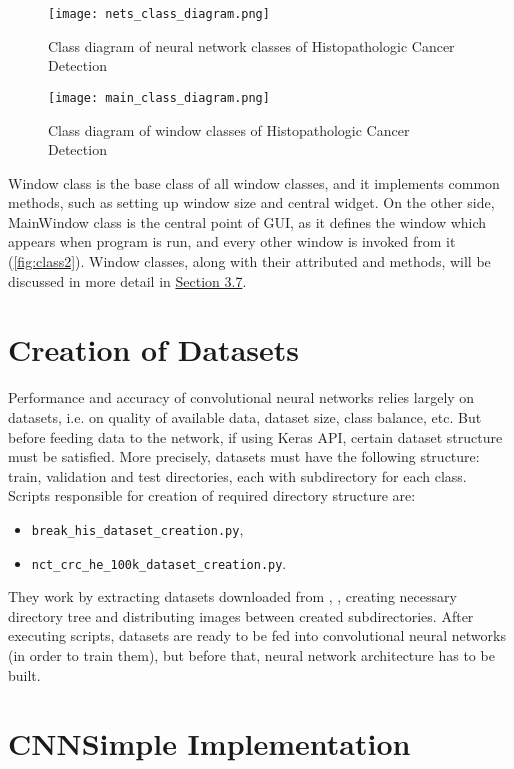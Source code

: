 \begin{figure}[h]
	\centering
	\texttt{[image: nets\_class\_diagram.png]}
	\caption{Class diagram of neural network classes of Histopathologic Cancer Detection}
	\label{fig:class1}
\end{figure}

\begin{figure}
	\centering
	\texttt{[image: main\_class\_diagram.png]}
	\caption{Class diagram of window classes of Histopathologic Cancer Detection}
	\label{fig:class2}
\end{figure}

Window class is the base class of all window classes, and it implements common methods, such as setting up window size and central widget. On the other side, MainWindow class is the central point of GUI, as it defines the window which appears when program is run, and every other window is invoked from it (\textcolor{red}{\autoref{fig:class2}}). Window classes, along with their attributed and methods, will be discussed in more detail in \textcolor{red}{\hyperref[gui]{Section 3.7}}.

\section{Creation of Datasets}

Performance and accuracy of convolutional neural networks relies largely on datasets, i.e. on quality of available data, dataset size, class balance, etc. But before feeding data to the network, if using Keras API, certain dataset structure must be satisfied. More precisely, datasets must have the following structure: train, validation and test directories, each with subdirectory for each class. Scripts responsible for creation of required directory structure are:
\begin{itemize}
	\itemsep 0em
	\item \texttt{break\_his\_dataset\_creation.py},
	\item \texttt{nct\_crc\_he\_100k\_dataset\_creation.py}.
\end{itemize} 
They work by extracting datasets downloaded from \cite{breakhis_bib}, \cite{nctcrche100k_bib}, creating necessary directory tree and distributing images between created subdirectories. After executing scripts, datasets are ready to be fed into convolutional neural networks (in order to train them), but before that, neural network architecture has to be built.
\clearpage

\section{CNNSimple Implementation}
\label{cnn}

